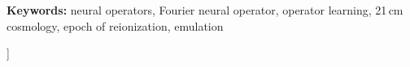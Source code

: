 \documentclass[10pt,a4paper,twocolumn]{article}
\begin{document}
{\begin{minipage}{0.88\textwidth}
    \vspace{8pt}
    \textbf{Keywords:} neural operators, Fourier neural operator, operator learning, 21\,cm cosmology, epoch of reionization, emulation
  \end{minipage}\hfill\null\par
  \vspace{16pt}
}]
\thispagestyle{plain}

{\small\tableofcontents}
\vspace{6pt}






\FloatBarrier
\appendix

\FloatBarrier

{\small

}
\end{document}
